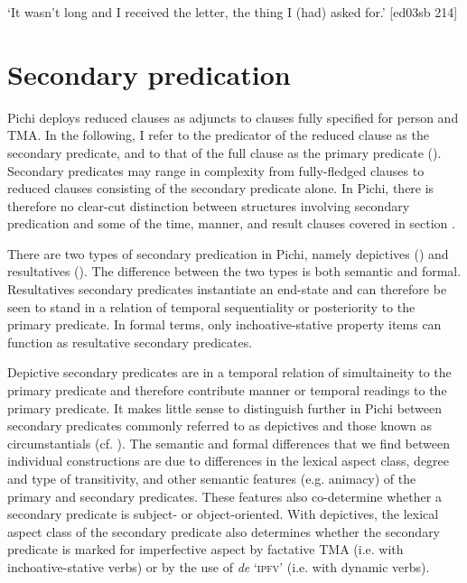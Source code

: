 \glt ‘It wasn’t long and I received the letter, the thing I (had) asked for.’ [ed03sb 214]
\z

\section{Secondary predication}\label{sec:11.3}

Pichi deploys reduced clauses as adjuncts to clauses fully specified for person and TMA. In the following, I refer to the predicator of the reduced clause as the secondary predicate, and to that of the full clause as the primary predicate (\citealt{BerndtHimmelmann2004,HimmelmannBerndt2006}). Secondary predicates may range in complexity from fully-fledged clauses to reduced clauses consisting of the secondary predicate alone. In Pichi, there is therefore no clear-cut distinction between structures involving secondary predication and some of the time, manner, and result clauses covered in section .


There are two types of secondary predication in Pichi, namely depictives () and resultatives (). The difference between the two types is both semantic and formal. Resultatives secondary predicates instantiate an end-state and can therefore be seen to stand in a relation of temporal sequentiality or posteriority to the primary predicate. In formal terms, only inchoative-stative property items can function as resultative secondary predicates.



Depictive secondary predicates are in a temporal relation of simultaineity to the primary predicate and therefore contribute manner or temporal readings to the primary predicate. It makes little sense to distinguish further in Pichi between secondary predicates commonly referred to as depictives and those known as circumstantials (cf. \citealt{HimmelmannBerndt2006}). The semantic and formal differences that we find between individual constructions are due to differences in the lexical aspect class, degree and type of transitivity, and other semantic features (e.g. animacy) of the primary and secondary predicates. These features also co-determine whether a secondary predicate is subject- or object-oriented. With depictives, the lexical aspect class of the secondary predicate also determines whether the secondary predicate is marked for imperfective aspect by factative TMA (i.e. with inchoative-stative verbs) or by the use of \textit{de} ‘\textsc{ipfv}’ (i.e. with dynamic verbs).


